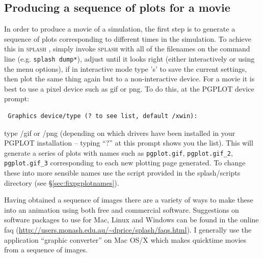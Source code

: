 \documentclass[a4paper,10pt]{article}
\newcommand{\splash}{\textsc{splash }}
\begin{document}
\subsection{Producing a sequence of plots for a movie}
\label{sec:movies} 
 In order to produce a movie of a simulation, the first step is to generate a sequence of plots corresponding to different times in the simulation. To achieve this in \splash, simply invoke \splash with all of the filenames on the command line (e.g. \verb+splash dump*+), adjust until it looks right (either interactively or using the menu options), if in interactive mode type 's' to save the current settings, then plot the same thing again but to a non-interactive device. For a movie it is best to use a pixel device such as gif or png. To do this, at the PGPLOT device prompt:
\begin{verbatim}
 Graphics device/type (? to see list, default /xwin):
\end{verbatim}
type /gif or /png (depending on which drivers have been installed in your PGPLOT installation -- typing ``?'' at this prompt shows you the list). This will generate a series of plots with names such as \verb+pgplot.gif+, \verb+pgplot.gif_2+, \verb+pgplot.gif_3+ corresponding to each new plotting page generated. To change these into more sensible names use the script provided in the splash/scripts directory (see \S\ref{sec:fixpgplotnames}). 
 
 Having obtained a sequence of images there are a variety of ways to make these into an animation using both free and commercial software. Suggestions on software packages to use for Mac, Linux and Windows can be found in the online faq (\url{http://users.monash.edu.au/~dprice/splash/faqs.html}). I generally use the application ``graphic converter'' on Mac OS/X which makes quicktime movies from a sequence of images.
 
 
\end{document}
